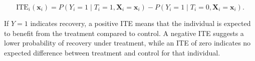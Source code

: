 \medskip

\begin{equation}
\text{ITE}_i(\mathbf{x}_i) = P(Y_i = 1 \mid T_i = 1, \mathbf{X}_i = \mathbf{x}_i) - P(Y_i = 1 \mid T_i = 0, \mathbf{X}_i = \mathbf{x}_i).
\end{equation}

\medskip

If $Y = 1$ indicates recovery, a positive ITE means that the individual is expected to benefit from the treatment compared to control. A negative ITE suggests a lower probability of recovery under treatment, while an ITE of zero indicates no expected difference between treatment and control for that individual.



\medskip




